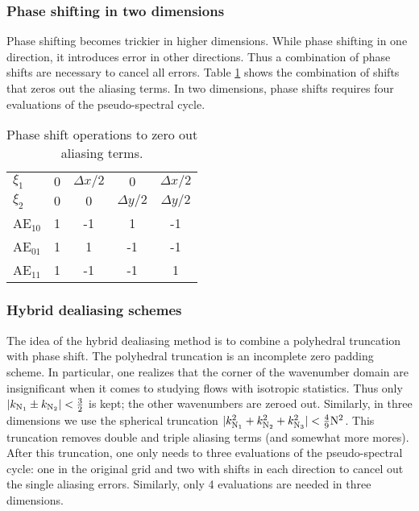 \documentclass[11pt]{article}
\begin{document}
\subsubsection*{Phase shifting in two dimensions}
Phase shifting becomes trickier in higher dimensions. While phase shifting in one direction,
it introduces error in other directions. Thus a combination of phase shifts are necessary to cancel all errors. 
Table \ref{tab:phase_shift_error_2d} shows the combination of shifts that zeros out the aliasing terms. In two dimensions, phase shifts requires four evaluations of the pseudo-spectral cycle.
\begin{table}
\label{tab:phase_shift_error_2d}
\caption{Phase shift operations to zero out aliasing terms.}
\centering
\begin{tabular}{l| c | c | c  | c}
    $\xi_1$  & $0$ & $\Delta x/2$ & $0$ & $\Delta x/2$\\ 
    $\xi_2$  & $0$ & $0$ & $\Delta y/2$ & $\Delta y/2$\\ 
    \hline
    AE$_{10}$ & 1 & -1 & 1 & -1\\
    AE$_{01}$ & 1 & 1 & -1 & -1\\
    AE$_{11}$ & 1 & -1 & -1 & 1\\
\end{tabular}
\end{table}

\subsubsection*{Hybrid dealiasing schemes}
The idea of the hybrid dealiasing method is to combine a polyhedral truncation with phase shift. The polyhedral truncation is an incomplete zero padding scheme. In particular, one realizes that the corner of the wavenumber domain are insignificant when it comes to studying flows with isotropic statistics. Thus only $|k_{\mathrm{N}_1} \pm k_{\mathrm{N}_2}| <
\tfrac{3}{2}$ is kept; the other wavenumbers are zeroed out. Similarly, in three dimensions we use the spherical truncation $|k_{\mathrm{N}_1}^2 + k_{\mathrm{N}_2}^2 + k_{\mathrm{N}_3}^2| < \tfrac{4}{9} \mathrm{N}^2$. This truncation removes double and triple aliasing terms (and somewhat more mores). After this truncation, one only needs to three evaluations of the pseudo-spectral cycle: one in the original grid and two with shifts in each direction to cancel out the single aliasing errors. Similarly, only 4 evaluations are needed in three dimensions. 
\end{document}
